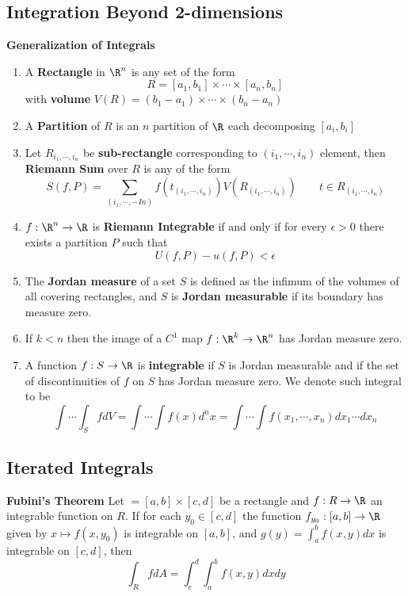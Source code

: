 \documentclass[11pt]{article}
\begin{document}
\subsection*{Integration Beyond 2-dimensions}

\begin{defn*}
  \textbf{Generalization of Integrals}
  \begin{enumerate}
    \item A \textbf{Rectangle} in $\R^n$ is any set of the form
    \[
      R = [a_1, b_1] \times \cdots \times [a_n, b_n]
    \]
    with \textbf{volume} $V(R) = (b_1 - a_1) \times \cdots \times (b_n - a_n)$
    \item A \textbf{Partition} of $R$ is an $n$ partition of $\R$ each decomposing $[a_i, b_i]$
    \item Let $R_{i_1, \cdots, i_n}$ be \textbf{sub-rectangle} corresponding to $(i_1, \cdots, i_n)$ element, then \textbf{Riemann Sum} over $R$ is any of the form
    \[
      S(f,P) = \sum_{(i_1, \cdots, -In)} f(t_{(i_1, \cdots, i_n)}) V(R_{(i_1,\cdots,i_n)}) \quad\quad t\in R_{(i_1, \cdots, i_n)}
    \]
    \item $f: \R^n \to \R$ is \textbf{Riemann Integrable} if and only if for every $\epsilon >0$ there exists a partition $P$ such that
    \[
      U(f,P) - u(f,P) < \epsilon
    \]
    \item The \textbf{Jordan measure} of a set $S$ is defined as the infimum of the volumes of all covering rectangles, and $S$ is \textbf{Jordan measurable} if its boundary has measure zero.
    \item If $k<n$ then the image of a $C^1$ map $f: \R^k \to \R^n$ has Jordan measure zero.
    \item A function $f:S \to \R$ is \textbf{integrable} if $S$ is Jordan measurable and if the set of discontinuities of $f$ on $S$ has Jordan measure zero. We denote such integral to be
    \[
      \int \cdots \int_S f dV = \int \cdots \int f(x) d^nx = \int \cdots\int f(x_1, \cdots, x_n) dx_1 \cdots dx_n
    \]
  \end{enumerate}
\end{defn*}


\subsection*{Iterated Integrals}

\begin{theorem*}
  \textbf{Fubini's Theorem} Let $ = [a,b]\times[ c,d]$ be a rectangle and $f: R\to\R$ an integrable function on $R$. If for each $y_0\in [c,d]$ the function $f_{y_0}: [a,b]\to \R$ given by $x\mapsto f(x, y_0)$ is integrable on $[a,b]$, and $g(y)=  \int_a^b f(x,y) dx$ is integrable on $[c,d]$, then
  \[
    \int_R f dA = \int_c^d \int_a^b f(x,y) dx dy
  \]
\end{theorem*}
\end{document}
